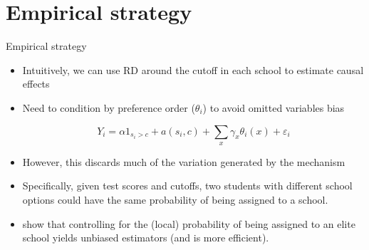 \documentclass[notes,11pt, aspectratio=169]{beamer}
\begin{document}
\section{Empirical strategy}

\begin{frame}{Empirical strategy}
  \begin{itemize}
     \vfill\item Intuitively, we can use RD around the cutoff in each school to estimate causal effects
     \vfill\item Need to condition by preference order ($\theta_i$) to avoid omitted variables
bias

$$Y_i=\alpha 1_{s_i>c}+a(s_i,c)+\sum_{x}\gamma_{x}\theta_{i}(x)+\varepsilon_i $$
\pause

\vfill\item However, this discards much of the variation generated by the mechanism
     \vfill\item Specifically, given test scores and cutoffs, two students with different school options could have the same probability of being assigned to a school.
\vfill\item \citet{abdulkadirouglu2022breaking} show that controlling for the (local) probability of being assigned to an elite school yields unbiased estimators (and is more efficient).
  \end{itemize}
\end{frame}


\end{document}
